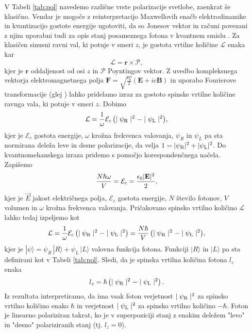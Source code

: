 \documentclass[12pt]{article}
\begin{document}
V Tabeli \ref{tab:pol} navedemo različne vrste polarizacije svetlobe, zaenkrat še klasično. Vendar je mogoče z reinterpretacijo Maxwellovih enačb elektrodinamike in kvantizacijo gostote energije ugotoviti, da so Jonesov vektor in računi povezani z njim  uporabni tudi za opis stanj posameznega fotona v kvantnem smislu \cite{PhotonPolarization2022}. Za klasičen sinusni ravni val, ki potuje v smeri $z$, je gostota vrtilne količine $\mathcal{L}$ enaka kar 
\begin{equation}
 \boldsymbol { \mathcal{L} } = \mathbf{r} \times \boldsymbol { \mathcal{P} },
\end{equation}
kjer je $\mathbf{r}$ oddaljenost od osi $z$ in $\boldsymbol{\mathcal{P}}$ Poyntingov vektor. Z uvedbo kompleksnega vektorja elektromagnetnega polja $ \mathbf{F} = \sqrt{\frac{\epsilon_0}{2}} (\mathbf{E} + ic \mathbf{B}) $ in uporabo Fourierove transformacije (glej \cite{bialynicki-birulaCanonicalSeparationAngular2011}) lahko pridelamo izraz za gostoto spinske vrtilne količine ravnga vala, ki potuje v smeri $z$. Dobimo
\begin{equation}
{\displaystyle {\mathcal {L}}={1 \over \omega }{\mathcal {E}}_{c}\left(\mid \psi _{\rm {R}}\mid ^{2}-\mid \psi _{\rm {L}}\mid ^{2}\right)},
\end{equation}
kjer je $\mathcal{E}_c$ gostota energije, $\omega$ krožna frekvenca valovanja, $\psi_R$ in $\psi_L$ pa sta normirana deleža leve in desne polarizacije, da velja ${\displaystyle 1=|\psi _{\rm {R}}|^{2}+|\psi _{\rm {L}}|^{2}}$. Do kvantnomehanskega izraza pridemo s pomočjo korespondenčnega načela. Zapišemo
\begin{equation}
    {N \hbar \omega \over V} = \mathcal{E}_c = \frac{ \epsilon_0 | \mathbf{E} |^2}{2}, \end{equation}
kjer je $\vec{E}$ jakost električnega polja, $\mathcal{E}_c$ gostota energije, $N$ število fotonov, $V$ volumen in $\omega$ krožna frekvenca valovanja. Pričakovano spinsko vrtilno količino $\mathcal {L}$ lahko tedaj izpeljemo kot
\begin{equation}
{\displaystyle {\mathcal {L}}={1 \over \omega }{\mathcal {E}}_{c}\left(\mid \psi _{\rm {R}}\mid ^{2}-\mid \psi _{\rm {L}}\mid ^{2}\right)={N\hbar  \over V}\left(\mid \psi _{\rm {R}}\mid ^{2}-\mid \psi _{\rm {L}}\mid ^{2}\right)},
\end{equation}
kjer je $| \psi \rangle = \psi_R \, | R \rangle + \psi_L \, |L \rangle$ valovna funkcija fotona. Funkciji $| R \rangle$ in $| L \rangle$ pa sta definirani kot v Tabeli \ref{tab:pol}.  Sledi, da je spinska vrtilna količina fotona $l_{z}$ enaka 
\begin{equation}
{\displaystyle l_{z}=\hbar \left(\mid \psi _{\rm {R}}\mid ^{2}-\mid \psi _{\rm {L}}\mid ^{2}\right).}
\end{equation}
Iz rezultata interpretiramo, da ima vsak foton verjetnost $\mid \psi _{\rm {R}}\mid ^{2}$ za spinsko vrtilno količino enako $\hbar$ in verjetnost $\mid \psi _{\rm {L}}\mid ^{2}$ za spinsko vrtilno količino $- \hbar$. Foton je linearno polariziran takrat, ko je v superpoziciji stanj z enakim deležem "levo" in "desno" polariziranih stanj (tj. $ l_z = 0$). \cite{PhotonPolarization2022}
\end{document}
